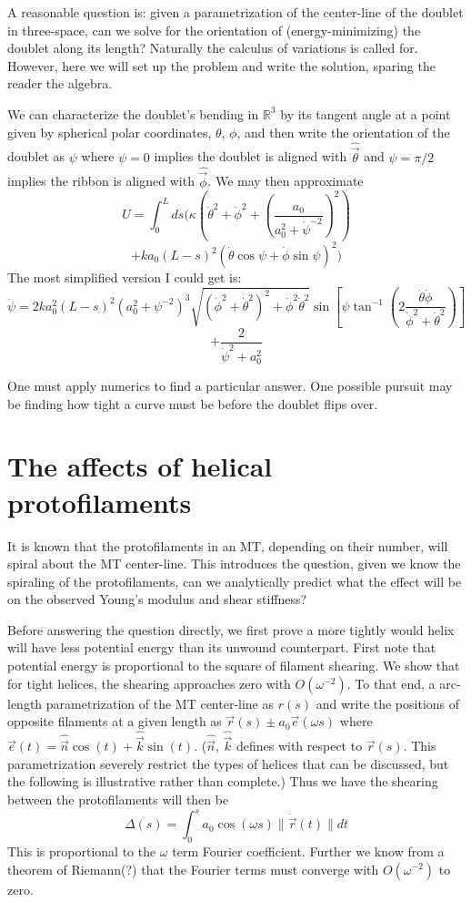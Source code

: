 \documentclass{article}
\theoremstyle{exampstyle} \newtheorem*{remark}{Remark}
\newcommand{\1}{\mathds{1}}
\begin{document}
A reasonable question is: given a parametrization of the center-line of the doublet in three-space, can we solve for the orientation of (energy-minimizing) the doublet along its length? Naturally the calculus of variations is called for. However, here we will set up the problem and write the solution, sparing the reader the algebra.

We can characterize the doublet's bending in $\mathbb{R}^3$ by its tangent angle at a point given by spherical polar coordinates, $\theta$, $\phi$, and then write the orientation of the doublet as $\psi$ where $\psi=0$ implies the doublet is aligned with $\hat{\vec{\theta}}$ and $\psi=\pi/2$ implies the ribbon is aligned with $\hat{\vec{\phi}}$. We may then approximate 
$$ U=\int_0^L ds ( \kappa \left( \dot{\theta}^2+\dot{\phi}^2+\left( \frac{a_0}{a_0^2+\dot{\psi}^{-2} } \right)^2\right) $$
$$+ ka_0(L-s)^2 \left(\dot{\theta}\cos \psi +\dot{\phi} \sin \psi \right)^2) $$
The most simplified version I could get is:
\[ \ddot{\psi}=2ka_0^2(L-s)^2\left(a_0^2+\psi^{-2}\right)^3\sqrt{\left(\dot{\phi}^2+\dot{\theta}^2\right)^2+\dot{\phi}^2\dot{\theta}^2 } 
\sin \left[ \psi \tan^{-1} \left( 2\frac {\dot{\theta}\dot{\phi}}{\dot{\phi}^2+\dot{\theta}^2} \right) \right] \]
$$+\frac{2}{\dot{\psi}^2+a_0^2}$$

One must apply numerics to find a particular answer. One possible pursuit may be finding how tight a curve must be before the doublet flips over.

\section{The affects of helical protofilaments}


It is known that the protofilaments in an MT, depending on their number, will spiral about the MT center-line. This introduces the question, given we know the spiraling of the protofilaments, can we analytically predict what the effect will be on the observed Young's modulus and shear stiffness? 

Before answering the question directly, we first prove a more tightly would helix will have less potential energy than its unwound counterpart. First note that potential energy is proportional to the square of filament shearing. We show that for tight helices, the shearing approaches zero with $O(\omega^{-2})$. To that end, a arc-length parametrization of the MT center-line as $r(s)$ and write the positions of opposite filaments at a given length as $\vec{r}(s)\pm a_0\vec{e}(\omega s)$ where $\vec{e}(t)=\hat{\vec{n}}\cos(t)+\hat{\vec{k}}\sin(t)$. ($\hat{\vec{n}}$, $\hat{\vec{k}}$ defines with respect to $\vec{r}(s)$. This parametrization severely restrict the types of helices that can be discussed, but the following is illustrative rather than complete.) Thus we have the shearing between the protofilaments will then be 
$$ \Delta(s)=\int_0^s a_0\cos(\omega s)\| \ddot{\vec{r}}(t) \| dt $$
This is proportional to the $\omega$ term Fourier coefficient. Further we know from a theorem of Riemann(?) that the Fourier terms must converge with $O(\omega^{-2})$ to zero. 
\end{document}
